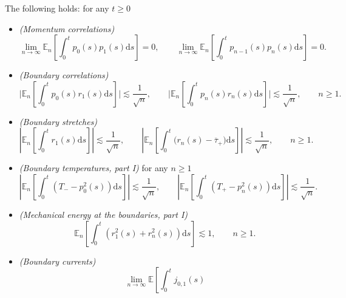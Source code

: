 \documentclass[EJP]{ejpecp} %
\renewcommand{\ge}{\geqslant}
\newcommand{\dd  }{\mathrm{d}}
\renewcommand{\bar}{\overline}
\numberwithin{equation}{section}
\begin{document}
\begin{lemma}\label{lem:bound2}


  The following  holds: for any $t\ge0$
  \begin{itemize}
  \item[(i)] \emph{(Momentum correlations)}
  \begin{equation}
  \lim_{n\to\infty} \mathbb{E}_n\left[ \int_0^t  p_{0}(s) p_{1}(s)\dd s\right] = 0, \qquad   \lim_{n\to\infty} \mathbb{E}_n\left[ \int_0^t  p_{n-1}(s) p_{n}(s)\dd s\right] = 0. \label{ex-p0p1}
\end{equation}

\item[(ii)] \emph{(Boundary correlations)}
  \begin{equation}
 \bigg| \mathbb{E}_n\left[ \int_0^t p_{0}(s) r_1(s) \dd s\right] \bigg|\lesssim
    \frac{1}{\sqrt{n}}, %
 \qquad \bigg|\mathbb{E}_n\left[ \int_0^t p_{n}(s) r_n(s) \dd s\right]\bigg|\lesssim
    \frac{1}{\sqrt{n}} , \qquad n\ge1. \label{ex-2-r}
\end{equation}
\item[(iii)] \emph{(Boundary stretches)}
  \begin{equation}
  \left|\mathbb{E}_n\left[ \int_0^t r_1(s)\dd s\right]\right|\lesssim
    \frac{1}{\sqrt{n}},   \qquad \left|\mathbb{E}_n\left[ \int_0^t \big(r_n(s) -\bar\tau_+\big)\dd s\right]\right|\lesssim
    \frac{1}{\sqrt{n}},  \qquad n\ge 1.  \label{ex-2-l1}
\end{equation}
\item[(iv)] \emph{(Boundary temperatures, part I)} for any $ n\ge1$
  \begin{equation}
    \label{eq:ex-1}
 \left| \mathbb{E}_n\left[   \int_0^t  \left(T_--p_{0}^2(s) \right)\dd
  s\right] \right|\lesssim \frac{1}{\sqrt n},\qquad    \left|\mathbb{E}_n\left[   \int_0^t  \left(T_+-p_{n}^2(s) \right)\dd
  s\right]\right| \lesssim \frac{1}{\sqrt n}.  
 \end{equation}
\item[(v)] \emph{(Mechanical energy at the boundaries, part I)}
  \begin{equation}
    \label{eq:13}
    \mathbb{E}_n\left[ \int_0^t \left(r_1^2(s) + r_n^2(s)\right)
      \dd s\right] \lesssim 1, \qquad n\ge1.
  \end{equation}
\item[(vi)] \emph{(Boundary currents)}
  \begin{equation}
    \label{eq:11}
      \lim_{n\to\infty}    \mathbb{E}\left[   \int_0^t  j_{0,1}(s)

\end{equation}
\end{itemize}
\end{lemma}
\end{document}
